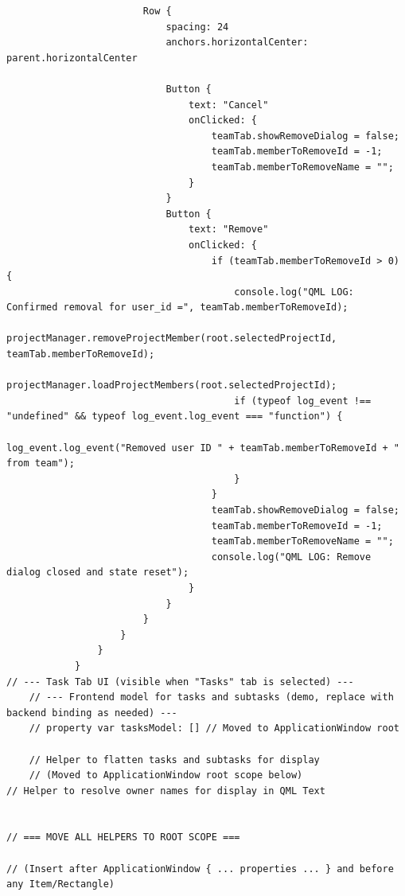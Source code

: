 \documentclass{report}
\begin{document}
\begin{lstlisting}
                        Row {
                            spacing: 24
                            anchors.horizontalCenter: parent.horizontalCenter

                            Button {
                                text: "Cancel"
                                onClicked: {
                                    teamTab.showRemoveDialog = false;
                                    teamTab.memberToRemoveId = -1;
                                    teamTab.memberToRemoveName = "";
                                }
                            }
                            Button {
                                text: "Remove"
                                onClicked: {
                                    if (teamTab.memberToRemoveId > 0) {
                                        console.log("QML LOG: Confirmed removal for user_id =", teamTab.memberToRemoveId);
                                        projectManager.removeProjectMember(root.selectedProjectId, teamTab.memberToRemoveId);
                                        projectManager.loadProjectMembers(root.selectedProjectId);
                                        if (typeof log_event !== "undefined" && typeof log_event.log_event === "function") {
                                            log_event.log_event("Removed user ID " + teamTab.memberToRemoveId + " from team");
                                        }
                                    }
                                    teamTab.showRemoveDialog = false;
                                    teamTab.memberToRemoveId = -1;
                                    teamTab.memberToRemoveName = "";
                                    console.log("QML LOG: Remove dialog closed and state reset");
                                }
                            }
                        }
                    }
                }
            }
// --- Task Tab UI (visible when "Tasks" tab is selected) ---
    // --- Frontend model for tasks and subtasks (demo, replace with backend binding as needed) ---
    // property var tasksModel: [] // Moved to ApplicationWindow root

    // Helper to flatten tasks and subtasks for display
    // (Moved to ApplicationWindow root scope below)
// Helper to resolve owner names for display in QML Text


// === MOVE ALL HELPERS TO ROOT SCOPE ===

// (Insert after ApplicationWindow { ... properties ... } and before any Item/Rectangle)


\end{lstlisting}
\end{document}
